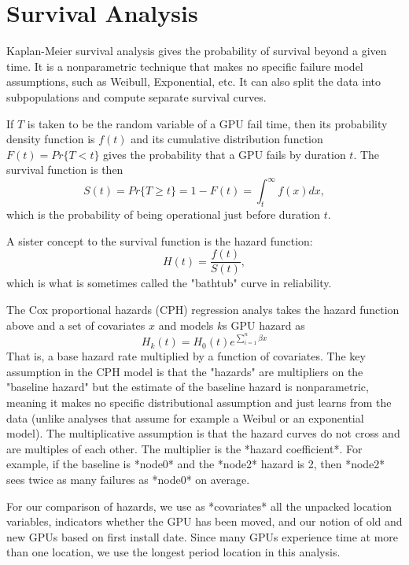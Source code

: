 \section{Survival Analysis}
\label{sec:survival}


Kaplan-Meier survival analysis gives the probability of survival beyond a given time. It is a nonparametric technique that makes no specific failure model assumptions, such as Weibull, Exponential, etc. It can also split the data into subpopulations and compute separate survival curves.

If $T$ is taken to be the random variable of a GPU fail time, then its probability density function is $f(t)$ and its cumulative distribution function $F(t) = Pr\{T < t\}$ gives the probability that a GPU fails by duration $t$. The survival function is then
\begin{displaymath}
  S(t) = Pr\{T \geq t\} = 1 - F(t) = \int_t^\infty f(x)dx,
\end{displaymath}
which is the probability of being operational just before duration $t$.

A sister concept to the survival function is the hazard function:
\begin{displaymath}
  H(t) = \frac{f(t)}{S(t)},
\end{displaymath}
which is what is sometimes called the "bathtub" curve in reliability.


The Cox proportional hazards (CPH) regression analys takes the hazard function above and a set of covariates $x$ and models $k$s GPU hazard as
\begin{displaymath}
  H_k(t) = H_0(t)e^{\sum\limits_{i=1}^n{\beta x}}
\end{displaymath}
That is, a base hazard rate multiplied by a function of
covariates. The key assumption in the CPH model is that the "hazards"
are multipliers on the "baseline hazard" but the estimate of the
baseline hazard is nonparametric, meaning it makes no specific
distributional assumption and just learns from the data (unlike
analyses that assume for example a Weibul or an exponential
model). The multiplicative assumption is that the hazard curves do not
cross and are multiples of each other. The multiplier is the *hazard
coefficient*. For example, if the baseline is *node0* and the *node2*
hazard is 2, then *node2* sees twice as many failures as *node0* on
average. 

For our comparison of hazards, we use as *covariates* all the unpacked
location variables, indicators whether the GPU has been moved, and our
notion of old and new GPUs based on first install date. Since many
GPUs experience time at more than one location, we use the longest
period location in this analysis. 

